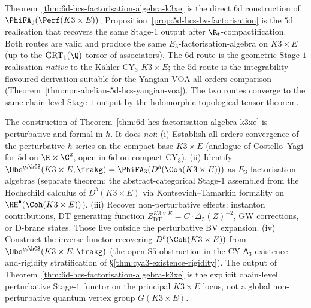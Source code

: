 \begin{remark}
\label{rem:6d-vs-5d-realisations-k3xe}
Theorem~\ref{thm:6d-hcs-factorisation-algebra-k3xe} is the direct $6$d
construction of $\PhiFA_3(\Perf(K3 \times E))$; Proposition~\ref{prop:5d-hcs-bv-factorisation}
is the $5$d realisation that recovers the same Stage-$1$ output after
$\R_t$-compactification. Both routes are valid and produce the same
$E_3$-factorisation-algebra on $K3 \times E$ \textup{(}up to the
$\mathrm{GRT}_1(\Q)$-torsor of associators\textup{).} The $6$d route is
the geometric Stage-$1$ realisation \emph{native} to the K\"ahler-CY$_3$
$K3 \times E$; the $5$d route is the integrability-flavoured derivation
suitable for the Yangian VOA all-orders comparison
\textup{(}Theorem~\ref{thm:non-abelian-5d-hcs-yangian-voa}\textup{).}
The two routes converge to the same chain-level Stage-$1$ output by the
holomorphic-topological tensor theorem.
\end{remark}

\begin{remark}
\label{rem:6d-hcs-k3e-open-ends}
The construction of Theorem~\ref{thm:6d-hcs-factorisation-algebra-k3xe}
is perturbative and formal in $\hbar$. It does \emph{not}:
(i) Establish all-orders convergence of the perturbative $\hbar$-series
on the compact base $K3 \times E$ \textup{(}analogue of Costello--Yagi
\cite{CostelloYagi2018} for $5$d on $\R \times \C^2$, open in $6$d on
compact CY$_3$\textup{)}.
(ii) Identify
$\Obs^{q,\hCS}(K3 \times E, \frakg) = \PhiFA_3(D^b(\Coh(K3 \times E)))$
as $E_3$-factorisation algebras
\textup{(}separate theorem; the abstract-categorical Stage-$1$ assembled
from the Hochschild calculus of $D^b(K3 \times E)$ via Kontsevich--Tamarkin
formality on $\HH^\bullet(\Coh(K3 \times E))$\textup{)}.
(iii) Recover non-perturbative effects: instanton contributions, DT
generating function $Z^{K3 \times E}_{\mathrm{DT}} = C \cdot \Delta_5(Z)^{-2}$,
GW corrections, or D-brane states. Those live outside the perturbative
BV expansion.
(iv) Construct the inverse functor recovering $D^b(\Coh(K3 \times E))$
from $\Obs^{q,\hCS}(K3 \times E, \frakg)$ \textup{(}the open S$5$
obstruction in the CY-$\mathsf{A}_3$ existence-and-rigidity stratification
of \S\ref{thm:cya3-existence-rigidity}\textup{)}.
The output of Theorem~\ref{thm:6d-hcs-factorisation-algebra-k3xe} is the
explicit chain-level perturbative Stage-$1$ functor on the principal
$K3 \times E$ locus, not a global non-perturbative quantum vertex group
$G(K3 \times E)$.
\end{remark}

